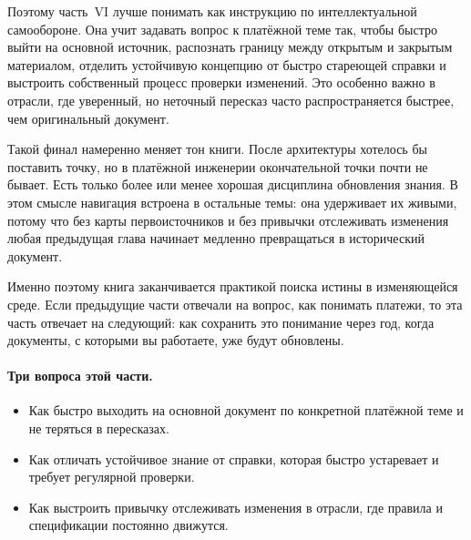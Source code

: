 Поэтому часть~VI лучше понимать как инструкцию по интеллектуальной
самообороне. Она учит задавать вопрос к платёжной теме так, чтобы быстро выйти на основной источник, распознать границу между открытым и закрытым материалом,
отделить устойчивую концепцию от быстро стареющей справки и выстроить
собственный процесс проверки изменений. Это особенно важно в отрасли,
где уверенный, но неточный пересказ часто распространяется быстрее,
чем оригинальный документ.

Такой финал намеренно меняет тон книги. После архитектуры хотелось бы
поставить точку, но в платёжной инженерии окончательной точки почти
не бывает. Есть только более или менее хорошая дисциплина обновления
знания. В этом смысле навигация встроена в остальные темы:
она удерживает их живыми, потому что без карты первоисточников
и без привычки отслеживать изменения любая предыдущая глава начинает
медленно превращаться в исторический документ.

Именно поэтому книга заканчивается практикой поиска истины в изменяющейся среде.
Если предыдущие части отвечали на вопрос, как понимать платежи, то эта
часть отвечает на следующий: как сохранить это понимание через год,
когда документы, с которыми вы работаете, уже будут обновлены.

\paragraph{Три вопроса этой части.}
\begin{itemize}
  \item Как быстро выходить на основной документ по конкретной
    платёжной теме и не теряться в пересказах.
  \item Как отличать устойчивое знание от справки, которая быстро
    устаревает и требует регулярной проверки.
  \item Как выстроить привычку отслеживать изменения в отрасли,
    где правила и спецификации постоянно движутся.
\end{itemize}
